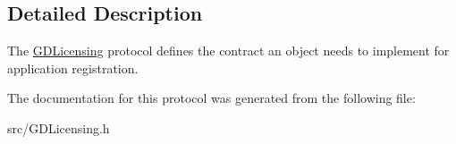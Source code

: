 \subsection{Detailed Description}
The \hyperlink{protocol_g_d_licensing-p}{GDLicensing} protocol defines the contract an object needs to implement for application registration. 

The documentation for this protocol was generated from the following file:\begin{DoxyCompactItemize}
\item 
src/GDLicensing.h\end{DoxyCompactItemize}
